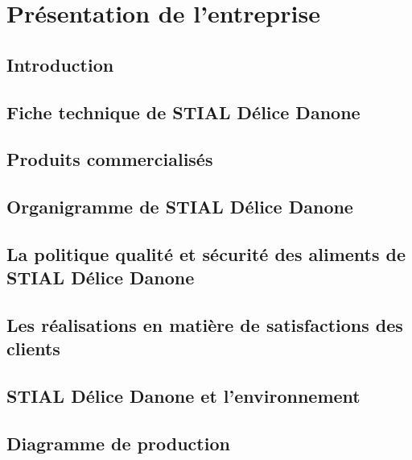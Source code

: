 \setcounter{mtc}{4} %
\chapter{Présentation de l’entreprise}
\minitoc  %

\graphicspath{{Chapter1/figures/}}
\pagestyle{fancy}
\fancyhf{}
\fancyhead[R]{\bfseries\rightmark}
\fancyfoot[R]{\thepage}
\renewcommand{\headrulewidth}{0.5pt}
\renewcommand{\footrulewidth}{0pt}
\renewcommand{\chaptermark}[1]{\markboth{\MakeUppercase{\chaptername~\thechapter. #1 }}{}}
\renewcommand{\sectionmark}[1]{\markright{\thechapter.\thesection~ #1}}

\begin{spacing}{1.2}

\section*{Introduction}

\section{ Fiche technique de STIAL Délice Danone}

\section{Produits commercialisés }
\section{Organigramme de STIAL Délice Danone}
\section{La politique qualité et sécurité des aliments  de  STIAL Délice Danone}
\section{Les réalisations en matière de satisfactions des clients}
\section{STIAL Délice Danone et l’environnement}
\section{Diagramme de  production}



\end{spacing}
